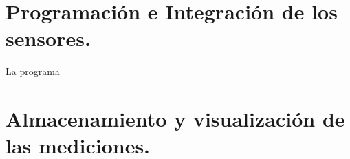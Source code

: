 \section{Programaci\'on e Integraci\'on de los sensores.}
La programa
\section{Almacenamiento y visualizaci\'on de las mediciones.}




